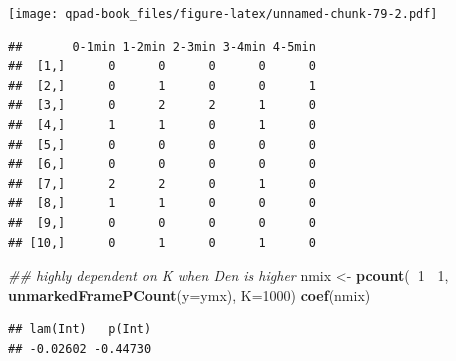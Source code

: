 \documentclass[12pt,]{book}
\newenvironment{Shaded}{\begin{snugshade}}{\end{snugshade}}
\newcommand{\CommentTok}[1]{\textcolor[rgb]{0.56,0.35,0.01}{\textit{#1}}}
\newcommand{\ControlFlowTok}[1]{\textcolor[rgb]{0.13,0.29,0.53}{\textbf{#1}}}
\newcommand{\DataTypeTok}[1]{\textcolor[rgb]{0.13,0.29,0.53}{#1}}
\newcommand{\DecValTok}[1]{\textcolor[rgb]{0.00,0.00,0.81}{#1}}
\newcommand{\FloatTok}[1]{\textcolor[rgb]{0.00,0.00,0.81}{#1}}
\newcommand{\KeywordTok}[1]{\textcolor[rgb]{0.13,0.29,0.53}{\textbf{#1}}}
\newcommand{\NormalTok}[1]{#1}
\newcommand{\OperatorTok}[1]{\textcolor[rgb]{0.81,0.36,0.00}{\textbf{#1}}}
\newcommand{\StringTok}[1]{\textcolor[rgb]{0.31,0.60,0.02}{#1}}
\begin{document}
\texttt{[image: qpad-book\_files/figure-latex/unnamed-chunk-79-2.pdf]}

\begin{Shaded}
\end{Shaded}

\begin{verbatim}
##       0-1min 1-2min 2-3min 3-4min 4-5min
##  [1,]      0      0      0      0      0
##  [2,]      0      1      0      0      1
##  [3,]      0      2      2      1      0
##  [4,]      1      1      0      1      0
##  [5,]      0      0      0      0      0
##  [6,]      0      0      0      0      0
##  [7,]      2      2      0      1      0
##  [8,]      1      1      0      0      0
##  [9,]      0      0      0      0      0
## [10,]      0      1      0      1      0
\end{verbatim}

\begin{Shaded}
\begin{Highlighting}[]
\CommentTok{## highly dependent on K when Den is higher}
\NormalTok{nmix <-}\StringTok{ }\KeywordTok{pcount}\NormalTok{(}\OperatorTok{~}\DecValTok{1} \OperatorTok{~}\DecValTok{1}\NormalTok{, }\KeywordTok{unmarkedFramePCount}\NormalTok{(}\DataTypeTok{y=}\NormalTok{ymx), }\DataTypeTok{K=}\DecValTok{1000}\NormalTok{)}
\KeywordTok{coef}\NormalTok{(nmix)}
\end{Highlighting}
\end{Shaded}

\begin{verbatim}
## lam(Int)   p(Int) 
## -0.02602 -0.44730
\end{verbatim}
\end{document}

